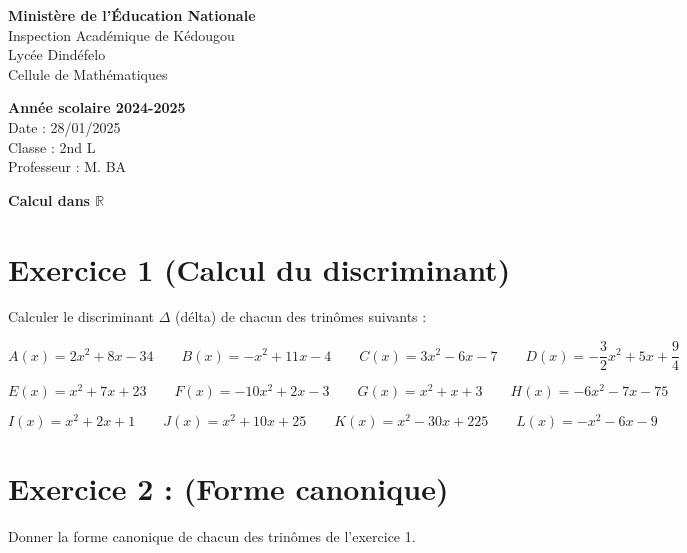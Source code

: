 \documentclass[12pt]{article}
\newcounter{exercice}
\begin{document}
\noindent
\begin{minipage}[t]{0.48\textwidth}
\raggedright
\textbf{Ministère de l'Éducation Nationale}\\
Inspection Académique de Kédougou\\
Lycée Dindéfelo\\
Cellule de Mathématiques
\end{minipage}
\hfill
\begin{minipage}[t]{0.48\textwidth}
\raggedleft
\textbf{Année scolaire 2024-2025}\\
Date : 28/01/2025\\
Classe : 2nd L\\
Professeur : M. BA
\end{minipage}

\vspace{0.5cm}

\begin{center}
\textbf{Calcul dans $\mathbb{R}$}
\end{center}

\section*{Exercice 1 (Calcul du discriminant)}

Calculer le discriminant \(\Delta\) (délta) de chacun des trinômes suivants :

\[ A(x) = 2x^2 + 8x - 34 \quad\quad B(x) = -x^2 + 11x - 4  \quad\quad C(x) = 3x^2 - 6x - 7 \quad\quad D(x) = -\frac{3}{2}x^2 + 5x + \frac{9}{4} \] 

\[ E(x) = x^2 + 7x + 23 \quad\quad F(x) = -10x^2 + 2x - 3 \quad\quad G(x) = x^2 + x + 3  \quad\quad H(x) = -6x^2 - 7x - 75 \] 
   
\[I(x) = x^2 + 2x + 1 \quad\quad J(x) = x^2 + 10x + 25 \quad\quad  K(x) = x^2 - 30x + 225 \quad\quad L(x) = -x^2 - 6x - 9 \]      

\section*{Exercice 2 : (Forme canonique)}

Donner la forme canonique de chacun des trinômes de l’exercice 1.
\end{document}
